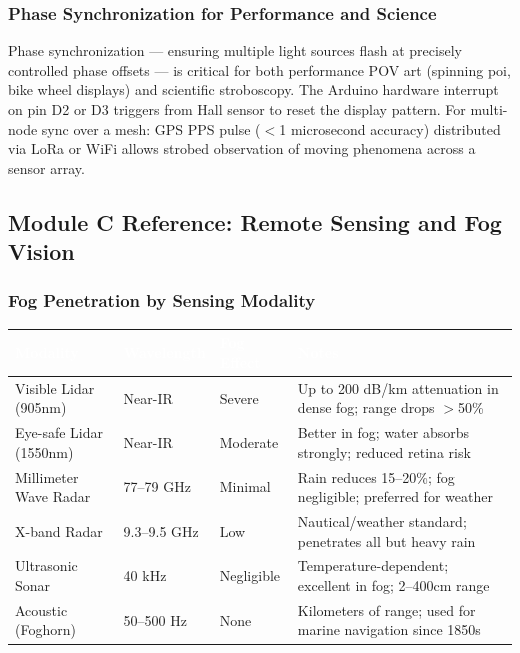 \documentclass[11pt,letterpaper]{article}
\newcommand{\tableheader}[1]{\textbf{\sffamily\textcolor{white}{#1}}}
\begin{document}
\subsubsection{Phase Synchronization for Performance and Science}

Phase synchronization --- ensuring multiple light sources flash at precisely controlled phase offsets --- is critical for both performance POV art (spinning poi, bike wheel displays) and scientific stroboscopy. The Arduino hardware interrupt on pin D2 or D3 triggers from Hall sensor to reset the display pattern. For multi-node sync over a mesh: GPS PPS pulse ($<$1 microsecond accuracy) distributed via LoRa or WiFi allows strobed observation of moving phenomena across a sensor array.

\subsection{Module C Reference: Remote Sensing and Fog Vision}

\subsubsection{Fog Penetration by Sensing Modality}

\begin{center}
\begin{tabularx}{\textwidth}{L{2.5cm}L{2.5cm}L{2cm}X}
\toprule
{}
\tableheader{Modality} & \tableheader{Wavelength} & \tableheader{Fog Effect} & \tableheader{Notes} \\
\midrule
Visible Lidar (905nm) & Near-IR & Severe & Up to 200 dB/km attenuation in dense fog; range drops $>$50\% \\
Eye-safe Lidar (1550nm) & Near-IR & Moderate & Better in fog; water absorbs strongly; reduced retina risk \\
Millimeter Wave Radar & 77--79 GHz & Minimal & Rain reduces 15--20\%; fog negligible; preferred for weather \\
X-band Radar & 9.3--9.5 GHz & Low & Nautical/weather standard; penetrates all but heavy rain \\
Ultrasonic Sonar & 40 kHz & Negligible & Temperature-dependent; excellent in fog; 2--400cm range \\
Acoustic (Foghorn) & 50--500 Hz & None & Kilometers of range; used for marine navigation since 1850s \\
\bottomrule
\end{tabularx}
\end{center}
\end{document}
